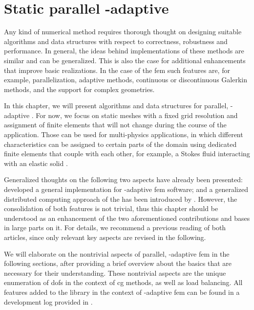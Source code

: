 \chapter{Static parallel \hp-adaptive }
\label{ch:parallel}
\glsresetall

Any kind of numerical method requires thorough thought on designing suitable algorithms and data structures with respect to correctness, robustness and performance. In general, the ideas behind implementations of these methods are similar and can be generalized.
This is also the case for additional enhancements that improve basic realizations. In the case of the \gls{fem} such features are, for example, parallelization, adaptive methods, continuous or discontinuous Galerkin methods, and the support for complex geometries.

In this chapter, we will present algorithms and data structures for parallel, \hp-adaptive . For now, we focus on static meshes with a fixed grid resolution and assignment of finite elements that will not change during the course of the application. Those can be used for multi-physics applications, in which different characteristics can be assigned to certain parts of the domain using dedicated finite elements that couple with each other, for example, a Stokes fluid interacting with an elastic solid \textcite{dealiistep-46}.

Generalized thoughts on the following two aspects have already been presented: \textcite{bangerth2009} developed a general implementation for \hp-adaptive \gls{fem} software; and a generalized distributed computing approach of the  has been introduced by \textcite{bangerth2012}. However, the consolidation of both features is not trivial, thus this chapter should be understood as an enhancement of the two aforementioned contributions and bases in large parts on it. For details, we recommend a previous reading of both articles, since only relevant key aspects are revised in the following.

We will elaborate on the nontrivial aspects of parallel, \hp-adaptive \gls{fem} in the following sections, after providing a brief overview about the basics that are necessary for their understanding. These nontrivial aspects are the unique enumeration of \glspl{dof} in the context of \gls{cg} methods, as well as load balancing. All features added to the \dealii{} library in the context of \hp-adaptive \gls{fem} can be found in a development log provided in \textcite{dealiiissue3511}.





